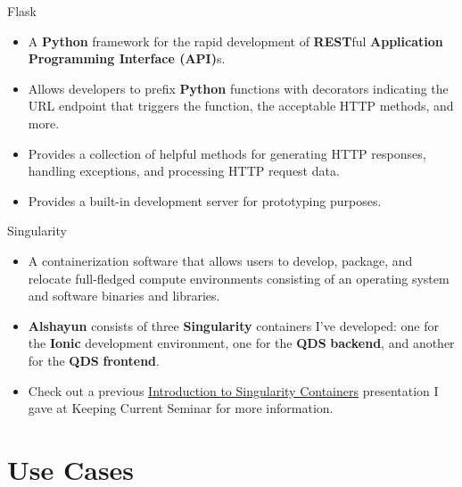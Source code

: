 \documentclass{beamer}
\begin{document}
\begin{frame}{Flask}
    \begin{itemize}
        \item A \textbf{Python} framework for the rapid development of
            \textbf{REST}ful \textbf{Application Programming Interface (API)}s.
        \item Allows developers to prefix \textbf{Python} functions with
            decorators indicating the URL endpoint that triggers the function,
            the acceptable HTTP methods, and more.
        \item Provides a collection of helpful methods for generating HTTP
            responses, handling exceptions, and processing HTTP request data.
        \item Provides a built-in development server for prototyping purposes.
    \end{itemize}
\end{frame}

\begin{frame}{Singularity}
    \begin{itemize}
        \item A containerization software that allows users to develop, package,
            and relocate full-fledged compute environments consisting of an
            operating system and software binaries and libraries.
        \item \textbf{Alshayun} consists of three \textbf{Singularity}
            containers I've developed: one for the \textbf{Ionic} development
            environment, one for the \textbf{QDS} \textbf{backend}, and another
            for the \textbf{QDS} \textbf{frontend}.
        \item Check out a previous
            \href{https://youtu.be/NeTRm7_JwX8}{Introduction to Singularity
            Containers} presentation I gave at Keeping Current Seminar for more
            information.
    \end{itemize}
\end{frame}

\section{Use Cases}
\end{document}
